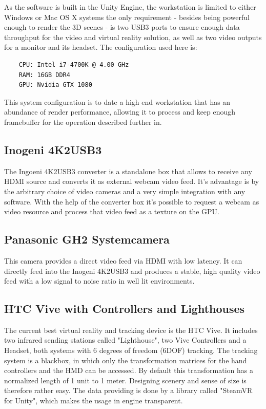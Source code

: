 As the software is built in the Unity Engine, the workstation is limited to 
either Windows or Mac OS X systems the only requirement - besides being 
powerful enough to render the 3D scenes - is two USB3 ports to ensure enough 
data throughput for the video and virtual reality solution, as well as two 
video outputs for a monitor and its headset.
\newline
The configuration used here is:
\begin{lstlisting}
	CPU: Intel i7-4700K @ 4.00 GHz
	RAM: 16GB DDR4
	GPU: Nvidia GTX 1080
\end{lstlisting}

This system configuration is to date a high end workstation that has an 
abundance of render performance, allowing it to process and keep enough 
framebuffer for the operation described further in.

\subsection{Inogeni 4K2USB3}
The Ingoeni 4K2USB3 converter is a standalone box that allows to receive any 
HDMI source and converts it as external webcam video feed. It's advantage is by 
the arbitrary choice of video cameras and a very simple integration with any 
software. With the help of the converter box it's possible to request a webcam 
as video resource and process that video feed as a texture on the GPU. 

\subsection{Panasonic GH2 Systemcamera}
This camera provides a direct video feed via HDMI with low latency. It can 
directly feed into the Inogeni 4K2USB3 and produces a stable, high quality 
video feed with a low signal to noise ratio in well lit environments.

\subsection{HTC Vive with Controllers and Lighthouses}
The current best virtual reality and tracking device is the HTC Vive. It 
includes two infrared sending stations called "Lighthouse", two Vive 
Controllers and a Headset, both systems with 6 degrees of freedom (6DOF) 
tracking. The tracking system is a blackbox, in which only the transformation 
matrices for the hand controllers and the HMD can be accessed. By default this 
transformation has a normalized length of 1 unit to 1 meter. Designing scenery 
and sense of size is therefore rather easy. The data providing is done by a 
library called "SteamVR for Unity", which makes the usage in engine transparent.

